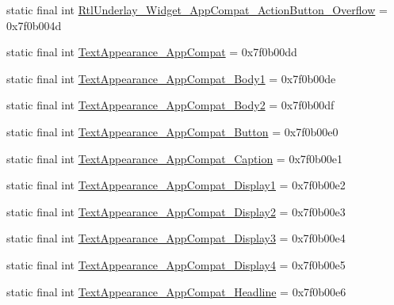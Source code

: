 \begin{CompactItemize}
static final int \hyperlink{classandroid_1_1support_1_1graphics_1_1drawable_1_1animated_1_1_r_1_1style_edcee0fa9ebcf0d7806246b2a5fcd71e}{RtlUnderlay\_\-Widget\_\-AppCompat\_\-ActionButton\_\-Overflow} = 0x7f0b004d
\item 
static final int \hyperlink{classandroid_1_1support_1_1graphics_1_1drawable_1_1animated_1_1_r_1_1style_9c80336a600791c56b756a11b35b629a}{TextAppearance\_\-AppCompat} = 0x7f0b00dd
\item 
static final int \hyperlink{classandroid_1_1support_1_1graphics_1_1drawable_1_1animated_1_1_r_1_1style_11c667154578c194caca24ba64d2c966}{TextAppearance\_\-AppCompat\_\-Body1} = 0x7f0b00de
\item 
static final int \hyperlink{classandroid_1_1support_1_1graphics_1_1drawable_1_1animated_1_1_r_1_1style_d83531da9dfadd1e015d77888cef99d9}{TextAppearance\_\-AppCompat\_\-Body2} = 0x7f0b00df
\item 
static final int \hyperlink{classandroid_1_1support_1_1graphics_1_1drawable_1_1animated_1_1_r_1_1style_a743395e9edd9ce2db69f3dd436bdd02}{TextAppearance\_\-AppCompat\_\-Button} = 0x7f0b00e0
\item 
static final int \hyperlink{classandroid_1_1support_1_1graphics_1_1drawable_1_1animated_1_1_r_1_1style_266751e47eb57712ea1ec08b918ddc4e}{TextAppearance\_\-AppCompat\_\-Caption} = 0x7f0b00e1
\item 
static final int \hyperlink{classandroid_1_1support_1_1graphics_1_1drawable_1_1animated_1_1_r_1_1style_3bf4e284a197a1fa2e2bb14ca36c5f99}{TextAppearance\_\-AppCompat\_\-Display1} = 0x7f0b00e2
\item 
static final int \hyperlink{classandroid_1_1support_1_1graphics_1_1drawable_1_1animated_1_1_r_1_1style_ca5050cc111f531505e7e72ba49d0cf8}{TextAppearance\_\-AppCompat\_\-Display2} = 0x7f0b00e3
\item 
static final int \hyperlink{classandroid_1_1support_1_1graphics_1_1drawable_1_1animated_1_1_r_1_1style_9b864640325e664a437252520da40e97}{TextAppearance\_\-AppCompat\_\-Display3} = 0x7f0b00e4
\item 
static final int \hyperlink{classandroid_1_1support_1_1graphics_1_1drawable_1_1animated_1_1_r_1_1style_0eb07341fe9a3208b450dd1c95e51814}{TextAppearance\_\-AppCompat\_\-Display4} = 0x7f0b00e5
\item 
static final int \hyperlink{classandroid_1_1support_1_1graphics_1_1drawable_1_1animated_1_1_r_1_1style_b1b6db08b4abf6314519644ca49cb753}{TextAppearance\_\-AppCompat\_\-Headline} = 0x7f0b00e6
\item 

\end{CompactItemize}

